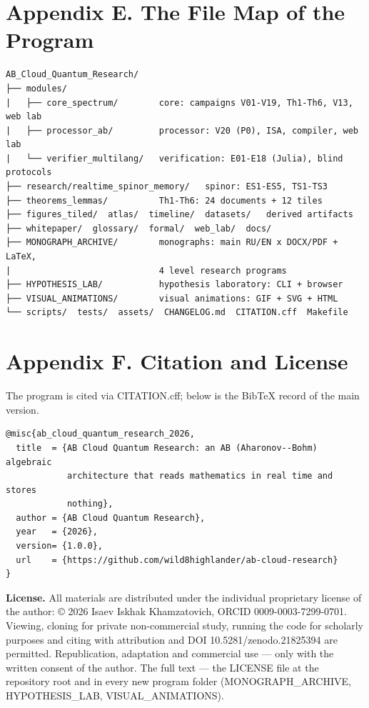 \documentclass[11pt,a4paper]{article}
\begin{document}
\section{Appendix E. The File Map of the Program}

\begin{verbatim}
AB_Cloud_Quantum_Research/
├── modules/
|   ├── core_spectrum/        core: campaigns V01-V19, Th1-Th6, V13, web lab
|   ├── processor_ab/         processor: V20 (P0), ISA, compiler, web lab
|   └── verifier_multilang/   verification: E01-E18 (Julia), blind protocols
├── research/realtime_spinor_memory/   spinor: ES1-ES5, TS1-TS3
├── theorems_lemmas/          Th1-Th6: 24 documents + 12 tiles
├── figures_tiled/  atlas/  timeline/  datasets/   derived artifacts
├── whitepaper/  glossary/  formal/  web_lab/  docs/
├── MONOGRAPH_ARCHIVE/        monographs: main RU/EN x DOCX/PDF + LaTeX,
|                             4 level research programs
├── HYPOTHESIS_LAB/           hypothesis laboratory: CLI + browser
├── VISUAL_ANIMATIONS/        visual animations: GIF + SVG + HTML
└── scripts/  tests/  assets/  CHANGELOG.md  CITATION.cff  Makefile
\end{verbatim}

\section{Appendix F. Citation and License}

The program is cited via CITATION.cff; below is the BibTeX record of the main version.

\begin{verbatim}
@misc{ab_cloud_quantum_research_2026,
  title  = {AB Cloud Quantum Research: an AB (Aharonov--Bohm) algebraic
            architecture that reads mathematics in real time and stores
            nothing},
  author = {AB Cloud Quantum Research},
  year   = {2026},
  version= {1.0.0},
  url    = {https://github.com/wild8highlander/ab-cloud-research}
}
\end{verbatim}

\textbf{License.} All materials are distributed under the individual proprietary license of the author: © 2026 Isaev Iskhak Khamzatovich, ORCID 0009-0003-7299-0701. Viewing, cloning for private non-commercial study, running the code for scholarly purposes and citing with attribution and DOI 10.5281/zenodo.21825394 are permitted. Republication, adaptation and commercial use — only with the written consent of the author. The full text — the LICENSE file at the repository root and in every new program folder (MONOGRAPH\_ARCHIVE, HYPOTHESIS\_LAB, VISUAL\_ANIMATIONS).
\end{document}
